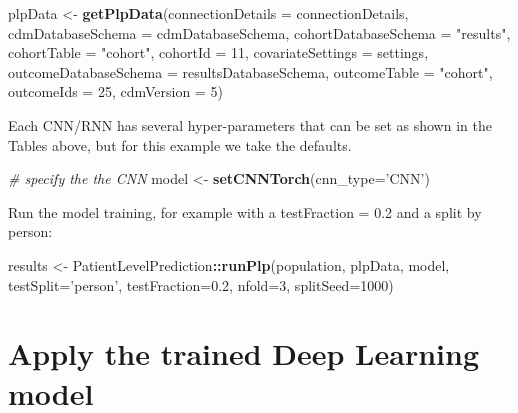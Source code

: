 \documentclass[
]{article}
\newenvironment{Shaded}{\begin{snugshade}}{\end{snugshade}}
\newcommand{\CommentTok}[1]{\textcolor[rgb]{0.56,0.35,0.01}{\textit{#1}}}
\newcommand{\DataTypeTok}[1]{\textcolor[rgb]{0.13,0.29,0.53}{#1}}
\newcommand{\DecValTok}[1]{\textcolor[rgb]{0.00,0.00,0.81}{#1}}
\newcommand{\FloatTok}[1]{\textcolor[rgb]{0.00,0.00,0.81}{#1}}
\newcommand{\KeywordTok}[1]{\textcolor[rgb]{0.13,0.29,0.53}{\textbf{#1}}}
\newcommand{\NormalTok}[1]{#1}
\newcommand{\OperatorTok}[1]{\textcolor[rgb]{0.81,0.36,0.00}{\textbf{#1}}}
\newcommand{\StringTok}[1]{\textcolor[rgb]{0.31,0.60,0.02}{#1}}
\begin{document}
\begin{Shaded}
\begin{Highlighting}[]
\NormalTok{plpData <-}\StringTok{ }\KeywordTok{getPlpData}\NormalTok{(}\DataTypeTok{connectionDetails =}\NormalTok{ connectionDetails,}
                        \DataTypeTok{cdmDatabaseSchema =}\NormalTok{ cdmDatabaseSchema,}
                        \DataTypeTok{cohortDatabaseSchema =} \StringTok{"results"}\NormalTok{,}
                        \DataTypeTok{cohortTable =} \StringTok{"cohort"}\NormalTok{,}
                        \DataTypeTok{cohortId =} \DecValTok{11}\NormalTok{,}
                        \DataTypeTok{covariateSettings =}\NormalTok{ settings,}
                        \DataTypeTok{outcomeDatabaseSchema =}\NormalTok{ resultsDatabaseSchema,}
                        \DataTypeTok{outcomeTable =} \StringTok{"cohort"}\NormalTok{,}
                        \DataTypeTok{outcomeIds =} \DecValTok{25}\NormalTok{,}
                        \DataTypeTok{cdmVersion =} \DecValTok{5}\NormalTok{)}
\end{Highlighting}
\end{Shaded}

Each CNN/RNN has several hyper-parameters that can be set as shown in
the Tables above, but for this example we take the defaults.

\begin{Shaded}
\begin{Highlighting}[]
\CommentTok{# specify the the CNN}
\NormalTok{model <-}\StringTok{ }\KeywordTok{setCNNTorch}\NormalTok{(}\DataTypeTok{cnn_type=}\StringTok{'CNN'}\NormalTok{)}
\end{Highlighting}
\end{Shaded}

Run the model training, for example with a testFraction = 0.2 and a
split by person:

\begin{Shaded}
\begin{Highlighting}[]
\NormalTok{results <-}\StringTok{ }\NormalTok{PatientLevelPrediction}\OperatorTok{::}\KeywordTok{runPlp}\NormalTok{(population, plpData, model,}
                                          \DataTypeTok{testSplit=}\StringTok{'person'}\NormalTok{,}
                                          \DataTypeTok{testFraction=}\FloatTok{0.2}\NormalTok{,}
                                          \DataTypeTok{nfold=}\DecValTok{3}\NormalTok{, }
                                          \DataTypeTok{splitSeed=}\DecValTok{1000}\NormalTok{) }
\end{Highlighting}
\end{Shaded}

\hypertarget{apply-the-trained-deep-learning-model}{%
\section{Apply the trained Deep Learning
model}\label{apply-the-trained-deep-learning-model}}
\end{document}
